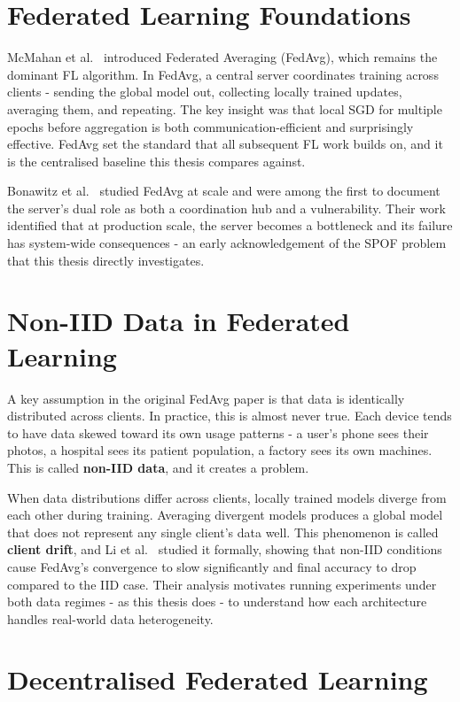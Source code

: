 \documentclass[12pt]{report}
\begin{document}
\section{Federated Learning Foundations}

McMahan et al.~\cite{mcmahan2017} introduced Federated Averaging (FedAvg), which
remains the dominant FL algorithm. In FedAvg, a central server coordinates training
across clients - sending the global model out, collecting locally trained updates,
averaging them, and repeating. The key insight was that local SGD for multiple
epochs before aggregation is both communication-efficient and surprisingly effective.
FedAvg set the standard that all subsequent FL work builds on, and it is the
centralised baseline this thesis compares against.

Bonawitz et al.~\cite{bonawitz2019} studied FedAvg at scale and were among the
first to document the server's dual role as both a coordination hub and a
vulnerability. Their work identified that at production scale, the server becomes
a bottleneck and its failure has system-wide consequences - an early
acknowledgement of the SPOF problem that this thesis directly investigates.

\section{Non-IID Data in Federated Learning}

A key assumption in the original FedAvg paper is that data is identically
distributed across clients. In practice, this is almost never true. Each device
tends to have data skewed toward its own usage patterns - a user's phone sees
their photos, a hospital sees its patient population, a factory sees its own
machines. This is called \textbf{non-IID data}, and it creates a problem.

When data distributions differ across clients, locally trained models diverge from
each other during training. Averaging divergent models produces a global model that
does not represent any single client's data well. This phenomenon is called
\textbf{client drift}, and Li et al.~\cite{li2020} studied it formally, showing
that non-IID conditions cause FedAvg's convergence to slow significantly and final
accuracy to drop compared to the IID case. Their analysis motivates running
experiments under both data regimes - as this thesis does - to understand how
each architecture handles real-world data heterogeneity.

\section{Decentralised Federated Learning}
\end{document}
